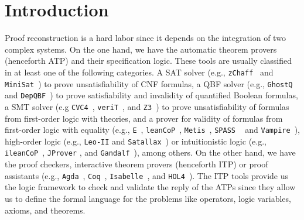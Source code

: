 \documentclass[main.tex]{subfiles}
\begin{document}

\section{Introduction}
\label{sec:introduction}

Proof reconstruction is a hard labor since it depends on the integration
of two complex systems. On the one hand, we have the automatic theorem provers
(henceforth ATP) and their specification logic. These tools are usually
classified in at least one of the following categories. A SAT solver
(e.g., \verb!zChaff!~\cite{Moskewicz2001} and \verb!MiniSat!~\cite{Een2004})
to prove unsatisfiability of CNF formulas, a QBF solver
(e.g., \verb!GhostQ!~\cite{Klieber2014} and \verb!DepQBF!~\cite{Lonsing2017})
to prove satisfiability and invalidity of quantified Boolean formulas, a SMT
solver (e.g \verb!CVC4!~\cite{Barrett2011}, \verb!veriT!~\cite{bouton2009},
and \verb!Z3!~\cite{DeMoura2008}) to prove unsatisfiability of formulas
from first-order logic with theories, and a prover for validity of
formulas from first-order logic with equality
(e.g., \verb!E!~\cite{Schulz:AICOM-2002}, \verb!leanCoP!~\cite{Otten2008},
\verb!Metis!~\cite{hurd2003first}, \verb!SPASS! ~\cite{Weidenbach2009} and
\verb!Vampire!~\cite{Riazanov1999}), high-order logic (e.g., \verb!Leo-II!
\cite{Benzmuller2008} and \verb!Satallax!~\cite{Brown2012}) or intuitionistic
logic (e.g., \verb!ileanCoP!~\cite{Otten2008}, \verb!JProver!
\cite{Schmitt2001}, and \verb!Gandalf!~\cite{Tammet1997}), among others.
On the other hand, we have the proof checkers, interactive theorem provers
(henceforth ITP) or proof assistants (e.g., \verb!Agda!~\cite{agdateam},
\verb!Coq!~\cite{coqteam}, \verb!Isabelle!~\cite{paulson1994isabelle}, and
\verb!HOL4!~\cite{norrish2007hol}).
The ITP tools provide us the logic framework to check and validate the
reply of the ATPs since they allow us to define the formal language for
the problems like operators, logic variables, axioms, and theorems.
\end{document}
